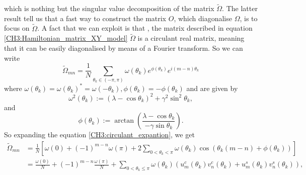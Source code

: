 which is nothing but the singular value decomposition of the matrix $\tilde{\Omega}$. The latter result tell us that a fast way to construct the matrix $O$, which diagonalise $\Omega$, is to focus on $\tilde{\Omega}$.
\newline
A fact that we can exploit is that , the matrix described in equation \eqref{CH3:Hamiltonian_matrix_XY_model} $\tilde{\Omega}$ is a circulant real matrix, meaning that it can be easily diagonalised by means of a Fourier transform. So we can write
\begin{equation}
\tilde{\Omega}_{m n}=\frac{1}{N} \sum_{\theta_{k} \in(-\pi, \pi)} \omega\left(\theta_{k}\right) e^{\phi\left(\theta_{k}\right)} e^{i(m-n) \theta_{k}}
\label{CH3:circulant_expantion}
\end{equation}
where $\omega\left(\theta_{k}\right)=\omega\left(\theta_{k}\right)^{*}=\omega\left(-\theta_{k}\right), \phi\left(\theta_{k}\right)=-\phi\left(\theta_{k}\right)$ and are given by
\begin{equation}
\omega^{2}\left(\theta_{k}\right):=\left(\lambda-\cos \theta_{k}\right)^{2}+\gamma^{2} \sin ^{2} \theta_{k},
\end{equation}
and
\begin{equation}
\phi\left(\theta_{k}\right):=\arctan \left(\frac{\lambda-\cos \theta_{k}}{-\gamma \sin \theta_{k}}\right).
\end{equation}
So expanding the equation \eqref{CH3:circulant_expantion}, we get
\begin{equation}
\begin{aligned}
\tilde{\Omega}_{m n} &=\frac{1}{N}\left[\omega(0)+(-1)^{m-n} \omega(\pi)+2 \sum_{0<\theta_{k}<\pi} \omega\left(\theta_{k}\right) \cos \left(\theta_{k}(m-n)+\phi\left(\theta_{k}\right)\right)\right] \\
&=\frac{\omega(0)}{N}+(-1)^{m-n} \frac{\omega(\pi)}{N}+\sum_{0<\theta_{k} \leq \pi} \omega\left(\theta_{k}\right)\left(u_{m}^{c}\left(\theta_{k}\right) v_{n}^{c}\left(\theta_{k}\right)+u_{m}^{s}\left(\theta_{k}\right) v_{n}^{s}\left(\theta_{k}\right)\right),
\end{aligned}
\end{equation}

